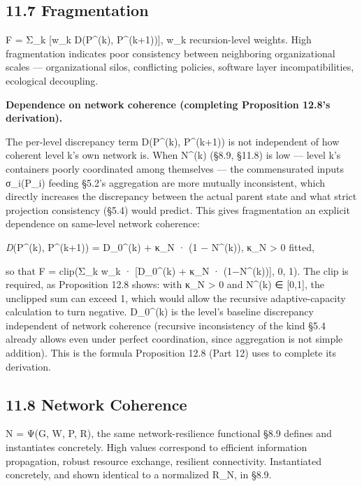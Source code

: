\documentclass[
]{article}
\begin{document}
\hypertarget{fragmentation}{%
\subsection{11.7 Fragmentation}\label{fragmentation}}

F = Σ\_k {[}w\_k D(P\^{}(k), P\^{}(k+1)){]}, w\_k recursion-level
weights. High fragmentation indicates poor consistency between
neighboring organizational scales --- organizational silos, conflicting
policies, software layer incompatibilities, ecological decoupling.

\textbf{Dependence on network coherence (completing Proposition 12.8's
derivation).}

The per-level discrepancy term D(P\^{}(k), P\^{}(k+1)) is not
independent of how coherent level k's own network is. When N\^{}(k)
(§8.9, §11.8) is low --- level k's containers poorly coordinated among
themselves --- the commensurated inputs σ\_i(P\_i) feeding §5.2's
aggregation are more mutually inconsistent, which directly increases the
discrepancy between the actual parent state and what strict projection
consistency (§5.4) would predict. This gives fragmentation an explicit
dependence on same-level network coherence:

\emph{D}(P\^{}(k), P\^{}(k+1)) = D\_0\^{}(k) + κ\_N · (1 − N\^{}(k)),
κ\_N \textgreater{} 0 fitted,

so that F = clip(Σ\_k w\_k · {[}D\_0\^{}(k) + κ\_N · (1−N\^{}(k)){]},
0, 1). The clip is required, as Proposition 12.8 shows: with κ\_N
\textgreater{} 0 and N\^{}(k) ∈ {[}0,1{]}, the unclipped sum can exceed 1,
which would allow the recursive adaptive-capacity calculation to turn
negative.
D\_0\^{}(k) is the level's baseline discrepancy independent of network
coherence (recursive inconsistency of the kind §5.4 already allows even
under perfect coordination, since aggregation is not simple addition).
This is the formula Proposition 12.8 (Part 12) uses to complete its
derivation.

\hypertarget{network-coherence}{%
\subsection{11.8 Network Coherence}\label{network-coherence}}

N = Ψ(G, W, P, R), the same network-resilience functional §8.9 defines
and instantiates concretely. High values correspond to efficient
information propagation, robust resource exchange, resilient
connectivity. Instantiated concretely, and shown identical to a
normalized R\_N, in §8.9.
\end{document}
